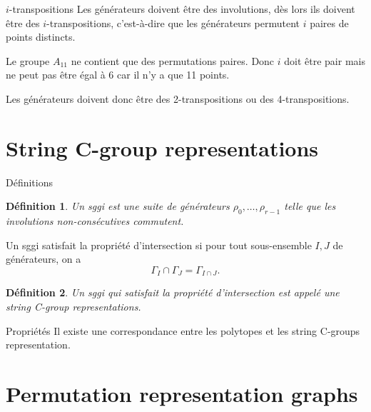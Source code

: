 \documentclass[10pt]{beamer}
\newtheorem{definition}{Définition}[section]
\begin{document}
\begin{frame}{$i$-transpositions}
  Les générateurs doivent être des involutions, dès lors ils doivent être des $i$-transpositions, c'est-à-dire que les générateurs permutent $i$ paires de points distincts.

  Le groupe $A_{11}$ ne contient que des permutations paires. Donc $i$ doit être pair mais ne peut pas être égal à 6 car il n'y a que 11 points.

  Les générateurs doivent donc être des 2-transpositions ou des 4-transpositions.
\end{frame}

\section{String C-group representations}

\begin{frame}{Définitions}
  \begin{definition}
    Un sggi est une suite de générateurs $\rho_0, \dots, \rho_{r-1}$ telle que les involutions non-consécutives commutent.
  \end{definition}


    Un sggi satisfait la propriété d'intersection si pour tout sous-ensemble $I, J$ de générateurs, on a
    \[
      \Gamma_{I} \cap \Gamma_{J} = \Gamma_{I \cap J}.
    \]

  \begin{definition}
    Un sggi qui satisfait la propriété d'intersection est appelé une string C-group representations.
  \end{definition}
\end{frame}

\begin{frame}{Propriétés}
  Il existe une correspondance entre les polytopes et les string C-groups representation.
\end{frame}

\section{Permutation representation graphs}
\end{document}
